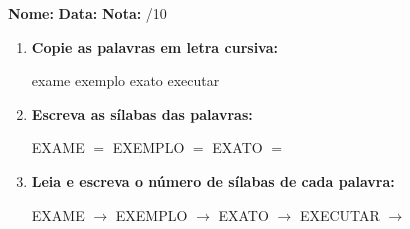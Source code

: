 \begin{exercicio}



\noindent\textbf{Nome:} \underline{\hspace{3.2cm}} \quad \textbf{Data:} \underline{\hspace{1.6cm}} \quad \textbf{Nota:} \underline{\hspace{0.9cm}}/10


\begin{enumerate}

  \item \textbf{Copie as palavras em letra cursiva:}
  \begin{center}
  exame \quad exemplo \quad exato \quad executar
  \end{center}
  \begin{center}
  \underline{\hspace{2.4cm}} \quad \underline{\hspace{2.4cm}} \quad \underline{\hspace{2.4cm}} \quad \underline{\hspace{2.4cm}}
  \end{center}

  \item \textbf{Escreva as sílabas das palavras:}
  \begin{center}
  EXAME $=$ \underline{\hspace{1.5cm}} \underline{\hspace{1.5cm}} \quad EXEMPLO $=$ \underline{\hspace{1.5cm}} \underline{\hspace{1.5cm}} \quad EXATO $=$ \underline{\hspace{1.5cm}} \underline{\hspace{1.5cm}}
  \end{center}

  \item \textbf{Leia e escreva o número de sílabas de cada palavra:}
  \begin{center}
  EXAME $\rightarrow$ \underline{\hspace{0.9cm}} \quad EXEMPLO $\rightarrow$ \underline{\hspace{0.9cm}} \quad EXATO $\rightarrow$ \underline{\hspace{0.9cm}} \quad EXECUTAR $\rightarrow$ \underline{\hspace{0.9cm}}
  \end{center}


\end{enumerate}
\end{exercicio}
